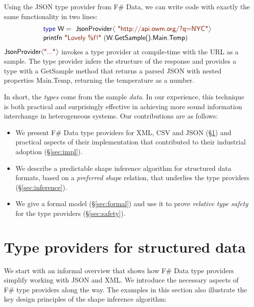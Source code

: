\documentclass[10pt,nocopyrightspace]{sigplanconf}
\newcommand{\langl}{\begin{picture}(4.5,7)
\put(1.1,2.5){\rotatebox{60}{\line(1,0){5.5}}}
\put(1.1,2.5){\rotatebox{300}{\line(1,0){5.5}}}
\end{picture}}
\newcommand{\rangl}{\begin{picture}(4.5,7)
\put(.9,2.5){\rotatebox{120}{\line(1,0){5.5}}}
\put(.9,2.5){\rotatebox{240}{\line(1,0){5.5}}}
\end{picture}}
\newcommand{\kvd}[1]{\textnormal{\textcolor{kvdclr}{\sffamily #1}}}
\newcommand{\str}[1]{\textnormal{\textcolor{strclr}{\sffamily "#1"}}}
\newcommand{\ident}[1]{\textnormal{\sffamily #1}}
\begin{document}
Using the JSON type provider from F\# Data, we can write code with exactly the
same functionality in two lines:
\vspace{-0.1em}
\begin{equation*}
\begin{array}{l}
 \kvd{type}~\ident{W} = \ident{JsonProvider}\langl\str{http://api.owm.org/?q=NYC}\rangl \\[0.1em]
 \ident{printfn}~\str{Lovely \%f!}~(\ident{W.GetSample().Main.Temp})
\end{array}
\end{equation*}
$\ident{JsonProvider}\langl\str{...}\rangl$ invokes a type provider \cite{fsharp-typeprov} at
compile-time with the URL as a sample. The type provider infers the structure of the response
and provides a type with a \ident{GetSample} method that returns a parsed JSON with nested
properties \ident{Main.Temp}, returning the temperature as a number.

In short, the \emph{types} come from the sample \emph{data}. In our experience, this technique is
both practical and surprisingly effective in achieving more sound information interchange
in heterogeneous systems. Our contributions are as follows:

\begin{itemize}
\item We present F\# Data type providers for XML, CSV and JSON (\S\ref{sec:providers})
  and practical aspects of their implementation that contributed to their industrial
  adoption (\S\ref{sec:impl}).

\item We describe a predictable shape inference algorithm for structured data formats,
  based on a \emph{preferred shape} relation, that underlies the type providers
  (\S\ref{sec:inference}).

\item We give a formal model (\S\ref{sec:formal}) and use it to prove
  \emph{relative type safety} for the type providers (\S\ref{sec:safety}).
\end{itemize}





\section{Type providers for structured data}
\label{sec:providers}

We start with an informal overview that shows how F\# Data type providers simplify working with
JSON and XML. We introduce the necessary aspects of F\# type providers along the way. The examples
in this section also illustrate the key design principles of the shape inference algorithm:
\end{document}
